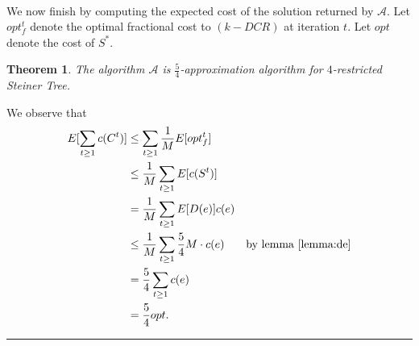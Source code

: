 \documentclass[letterpaper,12pt,oneside,onecolumn]{article}
\newcommand{\cA}{\mathcal{A}} \newcommand{\cB}{\mathcal{B}}
\newenvironment{proof}{{\bf Proof:  }}{\hfill\rule{2mm}{2mm}}
\newtheorem{theorem}[fact]{Theorem}
\begin{document}
\paragraph{}
We now finish by computing the expected cost of the solution returned by $\cA$. Let $opt^t_f$ denote the optimal fractional cost to $(k-DCR)$ at iteration $t$. Let $opt$ denote the cost of $S^*$.
\begin{theorem}
The algorithm $\cA$ is $\frac{5}{4}$-approximation algorithm for $4$-restricted Steiner Tree.
\end{theorem}
\begin{proof}
We observe that
\begin{align*}
E[\sum_{t\geq 1} c(C^t)] &\leq \sum_{t\geq 1} \frac{1}{M}E[opt^t_f] \\
&\leq \frac{1}{M} \sum_{t\geq 1} E[c(S^t)] \\
&=\frac{1}{M} \sum_{t\geq 1} E[D(e)]c(e) \\
&\leq \frac{1}{M} \sum_{t\geq 1} \frac{5}{4}M\cdot c(e) &\text{by lemma \ref{lemma:de}} \\
&=\frac{5}{4} \sum_{t \geq 1} c(e) \\
&= \frac{5}{4} opt.
\end{align*}
\end{proof}

\section{}
\end{document}
